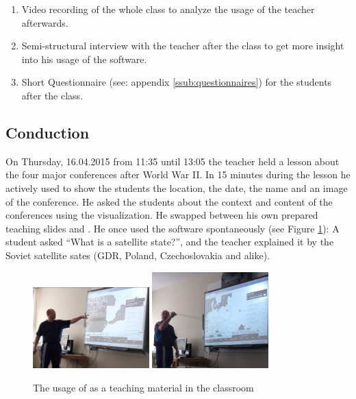 \begin{enumerate}
  \item Video recording of the whole class to analyze the usage of the teacher afterwards.
  \item Semi-structural interview with the teacher after the class to get more insight into his usage of the software.
  \item Short Questionnaire (see: appendix \ref{ssub:questionnaires}) for the students after the class.
\end{enumerate}


\subsection{Conduction} %
\label{sub:conduction-1}
On Thursday, 16.04.2015 from 11:35 until 13:05 the teacher held a lesson about the four major conferences after World War II. In 15 minutes during the lesson he actively used \HG to show the students the location, the date, the name and an image of the conference. He asked the students about the context and content of the conferences using the visualization. He swapped between his own prepared teaching slides and \HG. He once used the software spontaneously (see Figure \ref{fig:teacher}): A student asked ``What is a satellite state?'', and the teacher explained it by the Soviet satellite sates (GDR, Poland, Czechoslovakia and alike).

\begin{figure}[ht]
  \begin{center}
    \includegraphics[width=0.4\textwidth]{graphics/teacher-2.png}
    \includegraphics[width=0.4\textwidth]{graphics/teacher-1.png}
  \end{center}
  \caption{The usage of \HG as a teaching material in the classroom}
  \label{fig:teacher}
\end{figure}

